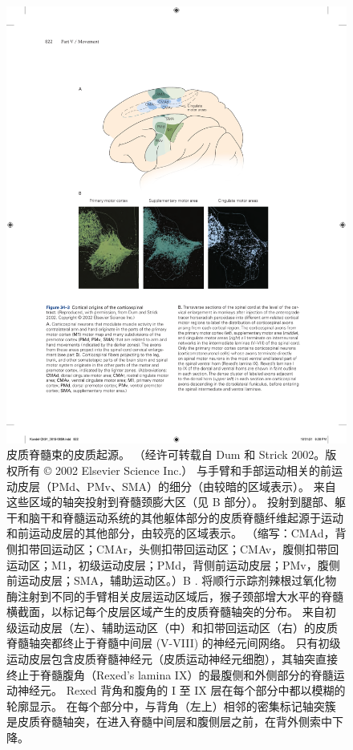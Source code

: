 \begin{figure}[htbp]
	\centering
	\includegraphics[width=0.95\linewidth]{chap34/fig_34_3}
	\caption{皮质脊髓束的皮质起源。 （经许可转载自 Dum 和 Strick 2002。版权所有 © 2002 Elsevier Science Inc.） 与手臂和手部运动相关的前运动皮层（PMd、PMv、SMA）的细分（由较暗的区域表示）。 来自这些区域的轴突投射到脊髓颈膨大区（见 B 部分）。 投射到腿部、躯干和脑干和脊髓运动系统的其他躯体部分的皮质脊髓纤维起源于运动和前运动皮层的其他部分，由较亮的区域表示。 （缩写：CMAd，背侧扣带回运动区；CMAr，头侧扣带回运动区；CMAv，腹侧扣带回运动区；M1，初级运动皮层；PMd，背侧前运动皮层；PMv，腹侧前运动皮层；SMA，辅助运动区。）B . 将顺行示踪剂辣根过氧化物酶注射到不同的手臂相关皮层运动区域后，猴子颈部增大水平的脊髓横截面，以标记每个皮层区域产生的皮质脊髓轴突的分布。 来自初级运动皮层（左）、辅助运动区（中）和扣带回运动区（右）的皮质脊髓轴突都终止于脊髓中间层 (V-VIII) 的神经元间网络。 只有初级运动皮层包含皮质脊髓神经元（皮质运动神经元细胞），其轴突直接终止于脊髓腹角（Rexed's lamina IX）的最腹侧和外侧部分的脊髓运动神经元。 Rexed 背角和腹角的 I 至 IX 层在每个部分中都以模糊的轮廓显示。 在每个部分中，与背角（左上）相邻的密集标记轴突簇是皮质脊髓轴突，在进入脊髓中间层和腹侧层之前，在背外侧索中下降。}
	\label{fig:34_3}
\end{figure}

